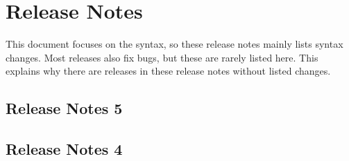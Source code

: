 
\section{Release Notes}
%
This document focuses on the \INTENS{} syntax, so these release notes mainly lists
syntax changes.
Most \INTENS{} releases also fix bugs, but these are rarely listed here.
This explains why there are releases in these release notes without listed changes.

\subsection{Release Notes 5}





\subsection{Release Notes 4}


%
